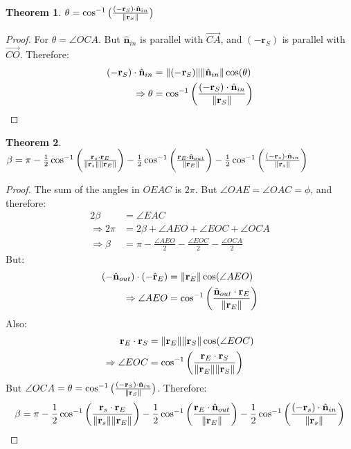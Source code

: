 \documentclass{article}
\theoremstyle{mystyle}
\newtheorem{theorem}{Theorem}[section]
\begin{document}
\begin{theorem}
$\theta = \cos^{-1}\big(\frac{(-\mathbf{r}_{S})\cdot \hat{\mathbf{n}}_{in}}{\norm{\mathbf{r}_{S}}}\big)$
\end{theorem}
\begin{proof}
For $\theta = \angle OCA$. But $\hat{\mathbf{n}}_{in}$ is parallel with $\overrightarrow{CA}$, and $(-\mathbf{r}_{S})$ is parallel with $\overrightarrow{CO}$. Therefore:
\begin{align}
    (-\mathbf{r}_{S})\cdot \hat{\mathbf{n}}_{in} &= \norm{(-\mathbf{r}_{S})}\norm{\hat{\mathbf{n}}_{in}}\cos(\theta)\\
    \Rightarrow \theta &= \cos^{-1}\bigg(\frac{(-\mathbf{r}_{S})\cdot \hat{\mathbf{n}}_{in}}{\norm{\mathbf{r}_{S}}}\bigg)
\end{align}
\end{proof}

\begin{theorem}
$\beta = \pi - \frac{1}{2}\cos^{-1}\bigg(\frac{\mathbf{r}_{s}\cdot \mathbf{r}_{E}}{\norm{\mathbf{r}_{s}}\norm{\mathbf{r}_{E}}}\bigg) - \frac{1}{2}\cos^{-1}\bigg(\frac{\mathbf{r}_{E}\cdot \hat{\mathbf{n}}_{out}}{\norm{\mathbf{r}_{E}}}\bigg) - \frac{1}{2}\cos^{-1}\bigg(\frac{(-\mathbf{r}_{s})\cdot \hat{\mathbf{n}}_{in}}{\norm{\mathbf{r}_{s}}}\bigg)$
\end{theorem}
\begin{proof}
The sum of the angles in $OEAC$ is $2\pi$. But $\angle OAE = \angle OAC = \phi$, and therefore:
\begin{align}
    2\beta &=\angle EAC \\
    \Rightarrow 2\pi &= 2\beta + \angle AEO + \angle EOC + \angle OCA\\
    \Rightarrow \beta &= \pi - \frac{\angle AEO}{2}-\frac{\angle EOC}{2}-\frac{\angle OCA}{2}
\end{align}
But:
\begin{align}
(-\hat{\mathbf{n}}_{out})\cdot (-\hat{\mathbf{r}}_{E}) &= \norm{\mathbf{r}_{E}}\cos(\angle AEO)\\
\Rightarrow \angle AEO &= \cos^{-1}\bigg(\frac{\hat{\mathbf{n}}_{out}\cdot \mathbf{r}_{E}}{\norm{\mathbf{r}_{E}}}\bigg)
\end{align}
Also:
\begin{align}
    \mathbf{r}_{E}\cdot \mathbf{r}_{S} &= \norm{\mathbf{r}_{E}}\norm{\mathbf{r}_{S}}\cos(\angle EOC)\\
    \Rightarrow \angle EOC &= \cos^{-1}\bigg(\frac{\mathbf{r}_{E}\cdot \mathbf{r}_{S}}{\norm{\mathbf{r}_{E}}\norm{\mathbf{r}_{S}}}\bigg)
\end{align}
But $\angle OCA = \theta = \cos^{-1}\big(\frac{(-\mathbf{r}_{S})\cdot \hat{\mathbf{n}}_{in}}{\norm{\mathbf{r}_{S}}}\big)$. Therefore:
\begin{equation}
\beta = \pi - \frac{1}{2}\cos^{-1}\bigg(\frac{\mathbf{r}_{s}\cdot \mathbf{r}_{E}}{\norm{\mathbf{r}_{s}}\norm{\mathbf{r}_{E}}}\bigg) - \frac{1}{2}\cos^{-1}\bigg(\frac{\mathbf{r}_{E}\cdot \hat{\mathbf{n}}_{out}}{\norm{\mathbf{r}_{E}}}\bigg) - \frac{1}{2}\cos^{-1}\bigg(\frac{(-\mathbf{r}_{s})\cdot \hat{\mathbf{n}}_{in}}{\norm{\mathbf{r}_{s}}}\bigg)
\end{equation}
\end{proof}
\end{document}
